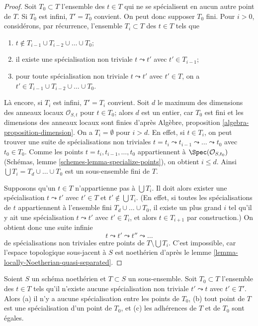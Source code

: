 \begin{proof}
Soit $T_0 \subset T$ l'ensemble des $t \in T$ qui ne se spécialisent en
aucun autre point de $T$. Si $T_0$ est infini, $T' = T_0$ convient.
On peut donc supposer $T_0$ fini.
Pour $i > 0$, considérons, par récurrence, l'ensemble $T_i \subset T$
des $t \in T$ tels que
\begin{enumerate}
\item $t \not \in T_{i - 1} \cup T_{i - 2} \cup \ldots \cup T_0$;
\item il existe une spécialisation non triviale $t \leadsto t'$ avec
$t' \in T_{i - 1}$;
\item pour toute spécialisation non triviale
$t \leadsto t'$ avec $t' \in T$, on a
$t' \in T_{i - 1} \cup T_{i - 2} \cup \ldots \cup T_0$.
\end{enumerate}
Là encore, si $T_i$ est infini, $T' = T_i$ convient.
Soit $d$ le maximum des dimensions des anneaux locaux
$\mathcal{O}_{S, t}$ pour $t \in T_0$; alors $d$ est un
entier, car $T_0$ est fini et les dimensions des anneaux locaux sont
finies d'après Algèbre, proposition \ref{algebra-proposition-dimension}.
On a $T_i = \emptyset$ pour $i > d$.
En effet, si $t \in T_i$, on peut trouver une suite
de spécialisations non triviales
$t = t_i \leadsto t_{i - 1} \leadsto \ldots \leadsto t_0$
avec $t_0 \in T_0$.
Comme les points $t = t_i, t_{i - 1}, \ldots, t_0$ appartiennent à
$\Spec(\mathcal{O}_{S, t_0})$
(Schémas, lemme \ref{schemes-lemma-specialize-points}),
on obtient $i \leq d$.
Ainsi $\bigcup T_i = T_d \cup \ldots \cup T_0$ est un sous-ensemble fini de $T$.

\medskip\noindent
Supposons qu'un $t \in T$ n'appartienne pas à $\bigcup T_i$. Il doit alors exister une spécialisation
$t \leadsto t'$ avec $t' \in T$ et $t' \not \in \bigcup T_i$. (En effet, si
toutes les spécialisations de $t$ appartiennent à l'ensemble fini $T_d \cup \ldots \cup T_0$,
il existe un plus grand $i$ tel qu'il y ait une spécialisation
$t \leadsto t'$ avec $t' \in T_i$, et alors $t \in T_{i + 1}$ par construction.)
On obtient donc une suite infinie
$$
t \leadsto t' \leadsto t'' \leadsto \ldots
$$
de spécialisations non triviales entre points de $T \setminus \bigcup T_i$.
C'est impossible, car l'espace topologique sous-jacent à $S$
est noethérien d'après le lemme \ref{lemma-locally-Noetherian-quasi-separated}.
\end{proof}

\begin{lemma}
\label{lemma-maximal-points}
Soient $S$ un schéma noethérien et $T \subset S$ un sous-ensemble. Soit
$T_0 \subset T$ l'ensemble des $t \in T$ tels qu'il n'existe aucune
spécialisation non triviale $t' \leadsto t$ avec $t' \in T'$. Alors (a) il n'y a
aucune spécialisation entre les points de $T_0$, (b) tout point de
$T$ est une spécialisation d'un point de $T_0$, et (c) les adhérences
de $T$ et de $T_0$ sont égales.
\end{lemma}

